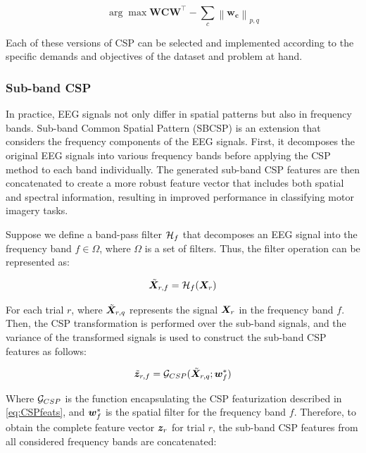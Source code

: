 \begin{equation}
    \arg \max \mathbf{W}\mathbf{C} \mathbf{W}^{\top}-\sum_c\left\|\mathbf{w}_{\mathbf{c}}\right\|_{p, q}
\end{equation}



Each of these versions of CSP can be selected and implemented according to the specific demands and objectives of the dataset and problem at hand.

\subsubsection{Sub-band CSP}

In practice, EEG signals not only differ in spatial patterns but also in frequency bands. Sub-band Common Spatial Pattern (SBCSP) is an extension that considers the frequency components of the EEG signals. First, it decomposes the original EEG signals into various frequency bands before applying the CSP method to each band individually. The generated sub-band CSP features are then concatenated to create a more robust feature vector that includes both spatial and spectral information, resulting in improved performance in classifying motor imagery tasks.

Suppose we define a band-pass filter $\mathcal {H}_f$ that decomposes an EEG signal into the frequency band $f \in \Omega$, where $\Omega$ is a set of filters. Thus, the filter operation can be represented as:

\begin{equation}
\tilde{\bm {X}}_{r,f} = \mathcal {H}_f(\bm {X}_r)    
\end{equation}

For each trial $r$, where $\tilde{\bm {X}}_{r,q}$ represents the signal $\bm {X}_r$ in the frequency band $f$. Then, the CSP transformation is performed over the sub-band signals, and the variance of the transformed signals is used to construct the sub-band CSP features as follows:

\begin{equation}
\tilde{\bm {z}}_{r,f} = \mathcal {G}_{CSP}(\tilde{\bm {X}}_{r,q}; \bm {w}_{f}^{*})    
\end{equation}

Where $\mathcal {G}_{CSP}$ is the function encapsulating the CSP featurization described in \eqref{eq:CSPfeats}, and $\bm {w}^{*}_{f}$ is the spatial filter for the frequency band $f$. Therefore, to obtain the complete feature vector $\bm {z}_r$ for trial $r$, the sub-band CSP features from all considered frequency bands are concatenated:

